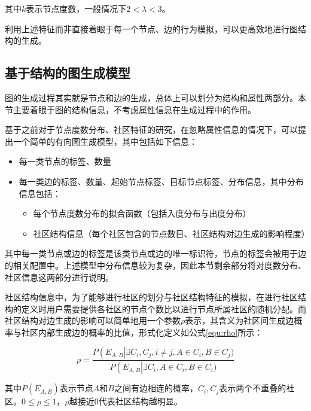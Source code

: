 \noindent 其中$k$表示节点度数，一般情况下$2<\lambda<3$。

利用上述特征而非直接着眼于每一个节点、边的行为模拟，可以更高效地进行图结构的生成。

\subsection{基于结构的图生成模型}
\label{cap:simplegen}

图的生成过程其实就是节点和边的生成，总体上可以划分为结构和属性两部分。本节主要着眼于图的结构信息，不考虑属性信息在生成过程中的作用。

基于之前对于节点度数分布、社区特征的研究，在忽略属性信息的情况下，可以提出一个简单的有向图生成模型，其中包括如下信息\cite{FastSGG}：

\begin{itemize}
    \item 每一类节点的标签、数量
    \item 每一类边的标签、数量、起始节点标签、目标节点标签、分布信息，其中分布信息包括：
    \begin{itemize}
        \item 每个节点度数分布的拟合函数（包括入度分布与出度分布）
        \item 社区结构信息（每个社区包含的节点数目、社区结构对边生成的影响程度）
    \end{itemize}
\end{itemize}

\vspace{0.2cm}

其中每一类节点或边的标签是该类节点或边的唯一标识符，节点的标签会被用于边的相关配置中。上述模型中分布信息较为复杂，因此本节剩余部分将对度数分布、社区信息这两部分进行说明。

社区结构信息中，为了能够进行社区的划分与社区结构特征的模拟，在进行社区结构的定义时用户需要提供各社区的节点个数比以进行节点所属社区的随机分配。而社区结构对边生成的影响可以简单地用一个参数$\rho$表示，其含义为社区间生成边概率与社区内部生成边的概率的比值，形式化定义如公式\ref{equ:rho}所示：

\vspace{-8mm}

\begin{equation}
    \label{equ:rho}
    \rho = \frac{P\left(E_{A,B}\right|\exists C_i, C_j, i\ne j, A\in C_i, B\in C_j)}{P\left(E_{A,B}\right|\exists C_i, A\in C_i, B\in C_i)}
\end{equation}

\noindent 其中$P\left(E_{A,B}\right)$表示节点$A$和$B$之间有边相连的概率，$C_i, C_j$表示两个不重叠的社区。$0\le \rho \le 1$，$\rho$越接近0代表社区结构越明显。

